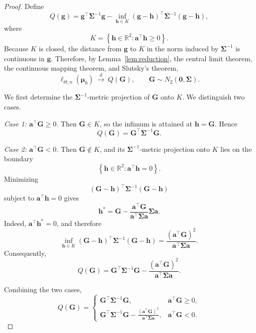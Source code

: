 \documentclass[10pt,a4paper]{amsart}
\begin{document}
\begin{proof}

Define
$$
Q(\boldsymbol{g})
=
\boldsymbol{g}^{\top}\boldsymbol{\Sigma}^{-1}\boldsymbol{g}
-
\inf_{\boldsymbol{h}\in K}
(\boldsymbol{g}-\boldsymbol{h})^{\top}
\boldsymbol{\Sigma}^{-1}
(\boldsymbol{g}-\boldsymbol{h}),
$$
where
$$
K
=
\left\{
\boldsymbol{h}\in\mathbb{R}^{2}:
\boldsymbol{a}^{\top}\boldsymbol{h}\geq 0
\right\}.
$$
Because $K$ is closed, the distance from $\boldsymbol{g}$ to $K$ in the norm induced by $\boldsymbol{\Sigma}^{-1}$ is continuous in $\boldsymbol{g}$. Therefore, by Lemma~\ref{lem:reduction}, the central limit theorem, the continuous mapping theorem, and Slutsky's theorem,
$$
\ell_{\Theta,n}(\boldsymbol{\mu}_0)
\ \xrightarrow{d}\
Q(\boldsymbol{G}),
\qquad
\boldsymbol{G}\sim
N_2(\boldsymbol{0},\boldsymbol{\Sigma}).
$$

We first determine the $\boldsymbol{\Sigma}^{-1}$-metric projection of $\boldsymbol{G}$ onto $K$. We distinguish two cases.

\medskip
\noindent\emph{Case 1: $\boldsymbol{a}^{\top}\boldsymbol{G}\geq 0$.}
Then $\boldsymbol{G}\in K$, so the infimum is attained at $\boldsymbol{h}=\boldsymbol{G}$. Hence
$$
Q(\boldsymbol{G})
=
\boldsymbol{G}^{\top}
\boldsymbol{\Sigma}^{-1}
\boldsymbol{G}.
$$

\medskip
\noindent\emph{Case 2: $\boldsymbol{a}^{\top}\boldsymbol{G}<0$.}
Then $\boldsymbol{G}\notin K$, and its $\boldsymbol{\Sigma}^{-1}$-metric projection onto $K$ lies on the boundary
$$
\left\{
\boldsymbol{h}\in\mathbb{R}^{2}:
\boldsymbol{a}^{\top}\boldsymbol{h}=0
\right\}.
$$
Minimizing
$$
(\boldsymbol{G}-\boldsymbol{h})^{\top}
\boldsymbol{\Sigma}^{-1}
(\boldsymbol{G}-\boldsymbol{h})
$$
subject to $\boldsymbol{a}^{\top}\boldsymbol{h}=0$ gives
$$
\boldsymbol{h}^{*}
=
\boldsymbol{G}
-
\frac{\boldsymbol{a}^{\top}\boldsymbol{G}}
     {\boldsymbol{a}^{\top}\boldsymbol{\Sigma}\boldsymbol{a}}
\boldsymbol{\Sigma}\boldsymbol{a}.
$$
Indeed, $\boldsymbol{a}^{\top}\boldsymbol{h}^{*}=0$, and therefore
$$
\inf_{\boldsymbol{h}\in K}
(\boldsymbol{G}-\boldsymbol{h})^{\top}
\boldsymbol{\Sigma}^{-1}
(\boldsymbol{G}-\boldsymbol{h})
=
\frac{
(\boldsymbol{a}^{\top}\boldsymbol{G})^{2}
}{
\boldsymbol{a}^{\top}\boldsymbol{\Sigma}\boldsymbol{a}
}.
$$
Consequently,
$$
Q(\boldsymbol{G})
=
\boldsymbol{G}^{\top}
\boldsymbol{\Sigma}^{-1}
\boldsymbol{G}
-
\frac{
(\boldsymbol{a}^{\top}\boldsymbol{G})^{2}
}{
\boldsymbol{a}^{\top}\boldsymbol{\Sigma}\boldsymbol{a}
}.
$$

Combining the two cases,
\begin{equation}
Q(\boldsymbol{G})
=
\begin{cases}
\boldsymbol{G}^{\top}
\boldsymbol{\Sigma}^{-1}
\boldsymbol{G},
&
\boldsymbol{a}^{\top}\boldsymbol{G}\geq 0,
\\[1.2ex]
\displaystyle
\boldsymbol{G}^{\top}
\boldsymbol{\Sigma}^{-1}
\boldsymbol{G}
-
\frac{
(\boldsymbol{a}^{\top}\boldsymbol{G})^{2}
}{
\boldsymbol{a}^{\top}\boldsymbol{\Sigma}\boldsymbol{a}
},
&
\boldsymbol{a}^{\top}\boldsymbol{G}<0.
\end{cases}
\label{eq:boundary_piecewise_Q}
\end{equation}


\end{proof}
\end{document}
